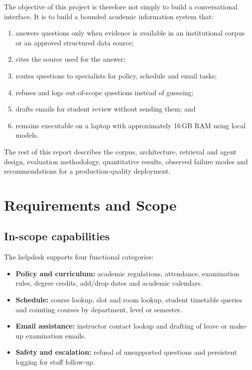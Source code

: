 \documentclass[11pt,a4paper]{article}
\begin{document}
The objective of this project is therefore not simply to build a conversational interface. It is to build a bounded academic information system that:
\begin{enumerate}[leftmargin=*]
  \item answers questions only when evidence is available in an institutional corpus or an approved structured data source;
  \item cites the source used for the answer;
  \item routes questions to specialists for policy, schedule and email tasks;
  \item refuses and logs out-of-scope questions instead of guessing;
  \item drafts emails for student review without sending them; and
  \item remains executable on a laptop with approximately 16\,GB RAM using local models.
\end{enumerate}

The rest of this report describes the corpus, architecture, retrieval and agent design, evaluation methodology, quantitative results, observed failure modes and recommendations for a production-quality deployment.

\section{Requirements and Scope}
\label{sec:requirements}

\subsection{In-scope capabilities}
The helpdesk supports four functional categories:
\begin{itemize}[leftmargin=*]
  \item \textbf{Policy and curriculum:} academic regulations, attendance, examination rules, degree credits, add/drop dates and academic calendars.
  \item \textbf{Schedule:} course lookup, slot and room lookup, student timetable queries and counting courses by department, level or semester.
  \item \textbf{Email assistance:} instructor contact lookup and drafting of leave or make-up examination emails.
  \item \textbf{Safety and escalation:} refusal of unsupported questions and persistent logging for staff follow-up.
\end{itemize}
\end{document}
